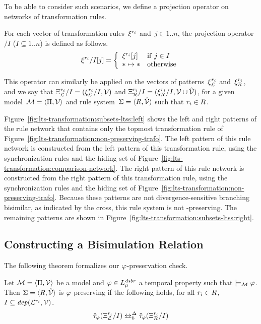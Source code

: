 To be able to consider such scenarios, we define a projection operator on networks of transformation rules.

\begin{definition}
\label{def:lts-transformation:projection}
For each vector of transformation rules~$\xi^{{r_i}}$ and~$j \in 1..n$, the projection operator $/I$ ($I \subseteq 1..n$) is defined as follows.
\[
\xi^{{r_i}}/I[j] = \left\{
\begin{array}{ll}
\xi^{{r_i}}[j]                    & {\rm if} ~ j \in I \\
\ast \mapsto \ast & {\rm otherwise}
\end{array}
\right.
\]
\end{definition}

\noindent
This operator can similarly be applied on the vectors of patterns~$\xi_{\mathcal{L}}^{{r_i}}$ and~$\xi_{\mathcal{R}}^{{r_i}}$, and we say that $\Xi_{\mathcal{L}}^{{r_i}}/I = (\xi_{\mathcal{L}}^{{r_i}}/I, {\mathcal{V}})$ and $\Xi_{\mathcal{R}}^{{r_i}}/I = (\xi_{\mathcal{R}}^{{r_i}}/I, {\mathcal{V}} \cup \hat{{\mathcal{V}}})$, for a given model~$\mathcal{M} = \langle \Pi, {\mathcal{V}} \rangle$ and rule system~$\Sigma = \langle R,\hat{{\mathcal{V}}} \rangle$ such that ${r_i} \in R$.

Figure~\ref{fig:lts-transformation:subsets-ltss:left} shows the left and right patterns of the rule network that contains only the topmost transformation rule of Figure~\ref{fig:lts-transformation:non-preserving-trafo}.
The left pattern of this rule network is constructed from the left pattern of this transformation rule, using the synchronization rules and the hiding set of Figure~\ref{fig:lts-transformation:comparison-network}.
The right pattern of this rule network is constructed from the right pattern of this transformation rule, using the synchronization rules and the hiding set of Figure~\ref{fig:lts-transformation:non-preserving-trafo}.
Because these patterns are not divergence-sensitive branching bisimilar, as indicated by the cross, this rule system is not \Sf-preserving.
The remaining patterns are shown in Figure~\ref{fig:lts-transformation:subsets-ltss:right}.

\subsection{Constructing a Bisimulation Relation}
The following theorem formalizes our $\varphi$-preservation check.

\begin{theorem}
\label{theo:lts-transformation:checkpreservation}
Let $\mathcal{M} = \langle \Pi, {\mathcal{V}} \rangle$ be a model and $\varphi \in \smash{L_\mu^{\it dsbr}}$ a temporal property such that $\models_{\mathcal{M}} \varphi$.
Then $\Sigma = \langle R,\hat{{\mathcal{V}}} \rangle$ is $\varphi$-preserving if the following holds, for all ${r_i} \in R$, $I \subseteq {\it dep}(\mathcal{L}^{{r_i}}, {\mathcal{V}})$.
\begin{equation}
\maxabstr(\Xi_{\Llts}^\ri/I ) \dsbbis \maxabstr(\Xi_{\Rlts}^\ri/I )
\label{eq:lts-transformation:maintheo}
\end{equation}
\end{theorem}

